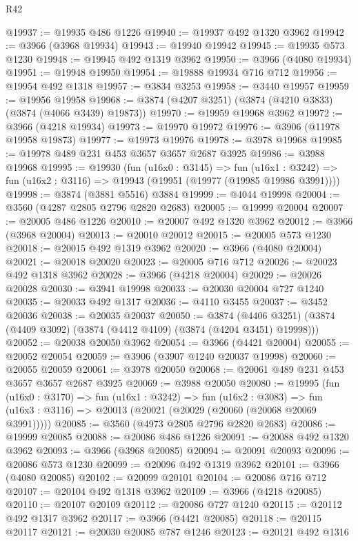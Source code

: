 \begin{lexlean}{R42}
\begin{coremodule}
@19937 := @19935 @486 @1226
@19940 := @19937 @492 @1320 @3962
@19942 := @3966 (@3968 @19934)
@19943 := @19940 @19942
@19945 := @19935 @573 @1230
@19948 := @19945 @492 @1319 @3962
@19950 := @3966 (@4080 @19934)
@19951 := @19948 @19950
@19954 := @19888 @19934 @716 @712
@19956 := @19954 @492 @1318
@19957 := @3834 @3253
@19958 := @3440 @19957
@19959 := @19956 @19958
@19968 := @3874 (@4207 @3251) (@3874 (@4210 @3833) (@3874 (@4066 @3439) @19873))
@19970 := @19959 @19968 @3962
@19972 := @3966 (@4218 @19934)
@19973 := @19970 @19972
@19976 := @3906 (@11978 @19958 @19873)
@19977 := @19973 @19976
@19978 := @3978 @19968
@19985 := @19978 @489 @231 @453 @3657 @3657 @2687 @3925
@19986 := @3988 @19968
@19995 := @19930
    (fun (u16x0 : @3145) =>
    fun (u16x1 : @3242) => fun (u16x2 : @3116) => @19943 (@19951 (@19977 (@19985 @19986 @3991))))
@19998 := @3874 (@3881 @5516) @3884
@19999 := @4044 @19998
@20004 := @3560 (@4287 @2805 @2796 @2820 @2683)
@20005 := @19999 @20004
@20007 := @20005 @486 @1226
@20010 := @20007 @492 @1320 @3962
@20012 := @3966 (@3968 @20004)
@20013 := @20010 @20012
@20015 := @20005 @573 @1230
@20018 := @20015 @492 @1319 @3962
@20020 := @3966 (@4080 @20004)
@20021 := @20018 @20020
@20023 := @20005 @716 @712
@20026 := @20023 @492 @1318 @3962
@20028 := @3966 (@4218 @20004)
@20029 := @20026 @20028
@20030 := @3941 @19998
@20033 := @20030 @20004 @727 @1240
@20035 := @20033 @492 @1317
@20036 := @4110 @3455
@20037 := @3452 @20036
@20038 := @20035 @20037
@20050 := @3874
    (@4406 @3251)
    (@3874 (@4409 @3092) (@3874 (@4412 @4109) (@3874 (@4204 @3451) @19998)))
@20052 := @20038 @20050 @3962
@20054 := @3966 (@4421 @20004)
@20055 := @20052 @20054
@20059 := @3906 (@3907 @1240 @20037 @19998)
@20060 := @20055 @20059
@20061 := @3978 @20050
@20068 := @20061 @489 @231 @453 @3657 @3657 @2687 @3925
@20069 := @3988 @20050
@20080 := @19995
    (fun (u16x0 : @3170) =>
    fun (u16x1 : @3242) =>
    fun (u16x2 : @3083) =>
    fun (u16x3 : @3116) => @20013 (@20021 (@20029 (@20060 (@20068 @20069 @3991)))))
@20085 := @3560 (@4973 @2805 @2796 @2820 @2683)
@20086 := @19999 @20085
@20088 := @20086 @486 @1226
@20091 := @20088 @492 @1320 @3962
@20093 := @3966 (@3968 @20085)
@20094 := @20091 @20093
@20096 := @20086 @573 @1230
@20099 := @20096 @492 @1319 @3962
@20101 := @3966 (@4080 @20085)
@20102 := @20099 @20101
@20104 := @20086 @716 @712
@20107 := @20104 @492 @1318 @3962
@20109 := @3966 (@4218 @20085)
@20110 := @20107 @20109
@20112 := @20086 @727 @1240
@20115 := @20112 @492 @1317 @3962
@20117 := @3966 (@4421 @20085)
@20118 := @20115 @20117
@20121 := @20030 @20085 @787 @1246
@20123 := @20121 @492 @1316

\end{coremodule}
\end{lexlean}
